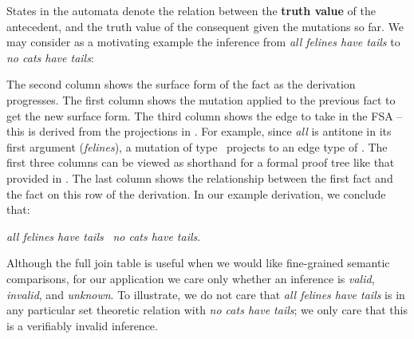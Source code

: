 States in the automata denote the relation between the
  \textbf{truth value} of
  the antecedent, and the truth value of the consequent given the
  mutations so far.
We may consider as a motivating example the inference from
  \textit{all felines have tails} to \textit{no cats have tails}:

\vspace{1em}
\noindent{}
\vspace{1em}

The second column shows the surface form of the fact as the derivation
  progresses.
The first column shows the mutation applied to the previous fact to get
  the new surface form.
The third column shows the edge to take in the FSA -- this is derived
  from the projections in .
For example, since \textit{all} is antitone in its first argument
  (\textit{felines}), a mutation of type \reverse\ projects to an edge
  type of \forward.
The first three columns can be viewed as shorthand for a
  formal proof tree like that provided in .
The last column shows the relationship between the first fact
  and the fact on this row of the derivation.
In our example derivation, we conclude that:

\begin{center}
  \textit{all felines have tails}
  \alternate\ \textit{no cats have tails}.
\end{center}

%
%
Although the full join table is useful when we would like fine-grained
  semantic comparisons, for our application we care only whether
  an inference is \textit{valid}, \textit{invalid}, and \textit{unknown}.
To illustrate, we do not care that \textit{all felines have tails}
  is in any particular set theoretic relation with
  \textit{no cats have tails}; we only care that this is a verifiably
  invalid inference.

